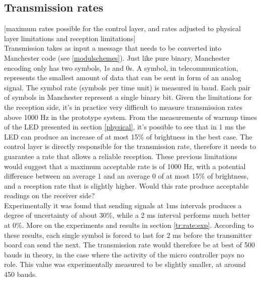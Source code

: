 \subsection{Transmission rates}
[maximum rates possible for the control layer, and rates adjusted to physical layer limitations and reception limitations]\\
Transmission takes as input a message that needs to be converted into Manchester code (see \ref{modulschemes}).
Just like pure binary, Manchester encoding only has two symbols, 1s and 0s.
A symbol, in telecommunication, represents the smallest amount of data that can be sent in form of an analog signal. The symbol rate (symbols per time unit) is measured in baud.
Each pair of symbols in Manchester represent a single binary bit. 
Given the limitations for the reception side, it's in practice very difficult to measure transmission rates above 1000 Hz in the prototype system.
From the measurements of warmup times of the LED presented in section \ref{physical}, it's possible to see that in 1 ms the LED can produce an increase of at most 15\% of brightness  in the best case. 
The control layer is directly responsible for the transmission rate, therefore it needs to guarantee a rate that allows a reliable reception.
These previous limitations would suggest that a maximum acceptable rate is of 1000 Hz, with a potential difference between an average 1 and an average 0 of at most 15\% of brightness, and a reception rate that is slightly higher.
Would this rate produce acceptable readings on the receiver side?\\
Experimentally it was found that sending signals at 1ms intervals produces a degree of uncertainty of about 30\%, while a 2 ms interval performs much better at 0\%.
More on the experiments and results in section \ref{tr:rate:exp}.
According to these results, each single symbol is forced to last for 2 ms before the transmitter board can send the next.
The transmission rate would therefore be at best of 500 bauds in theory, in the case where the activity of the micro controller pays no role.
This value was experimentally measured to be slightly smaller, at around 450 bauds. 

